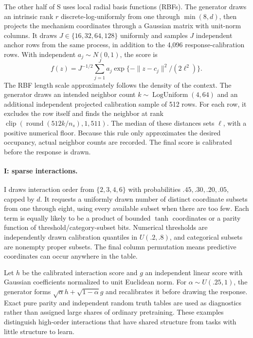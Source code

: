 \documentclass[11pt]{article}
\begin{document}
The other half of S uses local radial basis functions (RBFs). The generator draws an intrinsic rank $r$ discrete-log-uniformly from one through $\min(8,d)$, then projects the mechanism coordinates through a Gaussian matrix with unit-norm columns. It draws $J\in\{16,32,64,128\}$ uniformly and samples $J$ independent anchor rows from the same process, in addition to the 4,096 response-calibration rows. With independent $a_j\sim N(0,1)$, the score is
\[
 f(z)=J^{-1/2}\sum_{j=1}^{J}a_j
             \exp\{-\|z-c_j\|^2/(2\ell^2)\}.
\]
The RBF length scale approximately follows the density of the context. The generator draws an intended neighbor count $k\sim\operatorname{LogUniform}(4,64)$ and an additional independent projected calibration sample of 512 rows. For each row, it excludes the row itself and finds the neighbor at rank $\operatorname{clip}(\operatorname{round}(512k/n_s),1,511)$. The median of these distances sets $\ell$, with a positive numerical floor. Because this rule only approximates the desired occupancy, actual neighbor counts are recorded. The final score is calibrated before the response is drawn.

\paragraph{I: sparse interactions.}
I draws interaction order from $\{2,3,4,6\}$ with probabilities $.45,.30,.20,.05$, capped by $d$. It requests a uniformly drawn number of distinct coordinate subsets from one through eight, using every available subset when there are too few. Each term is equally likely to be a product of bounded $\tanh$ coordinates or a parity function of threshold/category-subset bits. Numerical thresholds are independently drawn calibration quantiles in $U(.2,.8)$, and categorical subsets are nonempty proper subsets. The final column permutation means predictive coordinates can occur anywhere in the table.

Let $h$ be the calibrated interaction score and $g$ an independent linear score with Gaussian coefficients normalized to unit Euclidean norm. For $\alpha\sim U(.25,1)$, the generator forms $\sqrt\alpha h+\sqrt{1-\alpha}g$ and recalibrates it before drawing the response. Exact pure parity and independent random truth tables are used as diagnostics rather than assigned large shares of ordinary pretraining. These examples distinguish high-order interactions that have shared structure from tasks with little structure to learn.
\end{document}
